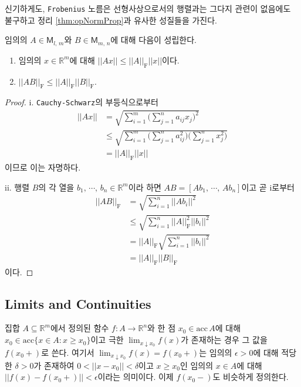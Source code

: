 신기하게도, \texttt{Frobenius} 노름은 선형사상으로서의 행렬과는 그다지 관련이 없음에도 불구하고 정리 \ref{thm:opNormProp}과 유사한 성질들을 가진다.

\begin{theorem}
    임의의 $A\in\mathsf{M}_{l,\,m}$와 $B\in\mathsf{M}_{m,\,n}$에 대해 다음이 성립한다.
    \begin{enumerate}
        \item 임의의 $x\in\mathbb{R}^m$에 대해 $||Ax||\leq||A||_\mathrm{F}||x||$이다.
        \item $||AB||_\mathrm{F}\leq||A||_\mathrm{F}||B||_\mathrm{F}$.
    \end{enumerate}
\end{theorem}

\begin{proof}
    i. \texttt{Cauchy-Schwarz}의 부등식으로부터
    \begin{align*}
        ||Ax||&=\sqrt{\sum_{i=1}^m\bigg(\sum_{j=1}^na_{ij}x_j\bigg)^2}\\
        &\leq\sqrt{\sum_{i=1}^m\bigg(\sum_{j=1}^na_{ij}^2\bigg)\bigg(\sum_{j=1}^nx_j^2\bigg)}\\
        &=||A||_\mathrm{F}||x||
    \end{align*}
    이므로 이는 자명하다.

    ii. 행렬 $B$의 각 열을 $b_1,\,\cdots,\,b_n\in\mathbb{R}^m$이라 하면 $AB=[Ab_1,\,\cdots,\,Ab_n]$이고 곧 i로부터
    \begin{align*}
        ||AB||_\mathrm{F}&=\sqrt{\sum_{i=1}^n||Ab_i||^2}\\
        &\leq\sqrt{\sum_{i=1}^n||A||_\mathrm{F}^2||b_i||^2}\\
        &=||A||_\mathrm{F}\sqrt{\sum_{i=1}^n||b_i||^2}\\
        &=||A||_\mathrm{F}||B||_\mathrm{F}
    \end{align*}
    이다.
\end{proof}

\subsection{Limits and Continuities}

\begin{definition}
    집합 $A\subseteq\mathbb{R}^m$에서 정의된 함수 $f:A\to\mathbb{R}^n$와 한 점 $x_0\in\mathrm{acc}\,A$에 대해 $x_0\in\mathrm{acc}\{x\in A:x\geq x_0\}$이고 극한 $\lim_{x\downarrow x_0}f(x)$가 존재하는 경우 그 값을 $f(x_0+)$로 쓴다. 여기서 $\lim_{x\downarrow x_0}f(x)=f(x_0+)$는 임의의 $\epsilon>0$에 대해 적당한 $\delta>0$가 존재하여 $0<||x-x_0||<\delta$이고 $x\geq x_0$인 임의의 $x\in A$에 대해 $||f(x)-f(x_0+)||<\epsilon$이라는 의미이다. 이제 $f(x_0-)$도 비슷하게 정의한다.
\end{definition}

